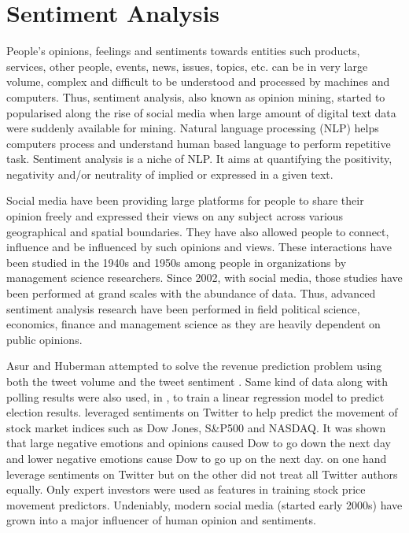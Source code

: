 \chapter{Sentiment Analysis}
People's opinions, feelings and sentiments towards entities such products, services, other people, events, news, issues, topics, etc. can be in very large volume, complex and difficult to be understood and processed by machines and computers. Thus, sentiment analysis, also known as opinion mining, started to popularised along the rise of social media when large amount of digital text data were suddenly available for mining. Natural language processing (NLP) helps computers process and understand human based language to perform repetitive task. Sentiment analysis is a niche of NLP. It aims at quantifying the positivity, negativity and/or neutrality of implied or expressed in a given text.

Social media have been providing large platforms for people to share their opinion freely and expressed their views on any subject across various geographical and spatial  boundaries. They have also allowed people to connect, influence and be influenced by such opinions and views. These interactions have been studied in the 1940s and 1950s among people in organizations by management science researchers. Since 2002, with social media, those studies have been performed at grand scales with the abundance of data. Thus, advanced sentiment analysis research have been performed in field political science, economics, finance and management science as they are heavily dependent on public opinions. 

Asur and Huberman attempted to solve the revenue prediction problem using both the tweet volume and the tweet sentiment \cite{Asur2010}. Same kind of data along with polling results were also used, in \cite{smeaton2011}, to train a linear regression model to predict election results. \cite{Zhang2011} leveraged sentiments on Twitter to help predict the movement of stock market indices such as Dow Jones, S\&P500 and NASDAQ. It was shown that large negative emotions and opinions caused Dow to go down the next day and lower negative emotions cause Dow to go up on the next day. \cite{barhaim2011} on one hand leverage sentiments on Twitter but on the other did not treat all Twitter authors equally. Only expert investors were used as features in training stock price movement predictors. Undeniably, modern social media (started early 2000s) have grown into a major influencer of human opinion and sentiments.

